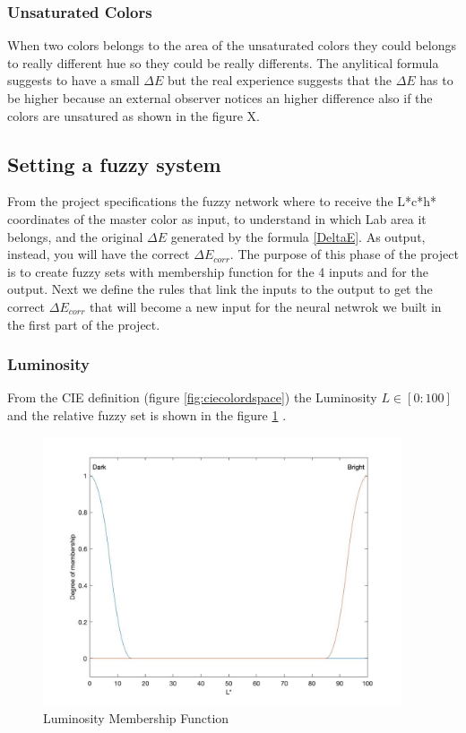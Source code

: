 \documentclass{article}
\begin{document}
\subsubsection{Unsaturated Colors}
When two colors belongs to the area of the unsaturated colors they could belongs to really different hue so they could be really differents. The anylitical formula suggests to have a small $\Delta E$ but the real experience suggests that the $\Delta E$ has to be higher because an external observer notices an higher difference also if the colors are unsatured as shown in the figure X.
\subsection{Setting a fuzzy system} 
From the project specifications the fuzzy network where to receive the L*c*h* coordinates of the master color as input, to understand in which Lab area it belongs, and the original $\Delta E$ generated by the formula \ref{DeltaE}. As output, instead, you will have the correct $\Delta E_{corr}$.
The purpose of this phase of the project is to create fuzzy sets with membership function for the 4 inputs and for the output. Next we define the rules that link the inputs to the output to get the correct $\Delta E_{corr}$ that will become a new input for the neural netwrok we built in the first part of the project.
\subsubsection{Luminosity}
From the CIE definition (figure \ref{fig:ciecolordspace}) the Luminosity $L\in[0:100]$ and the relative fuzzy set is shown in the figure \ref{fig:luminosity} .

\begin{figure}[!h]
	\center
 	\includegraphics[width=300pt]{./img/inputFuzzyL}
  	\caption{Luminosity Membership Function}\label{fig:luminosity}
\end{figure}
\end{document}
